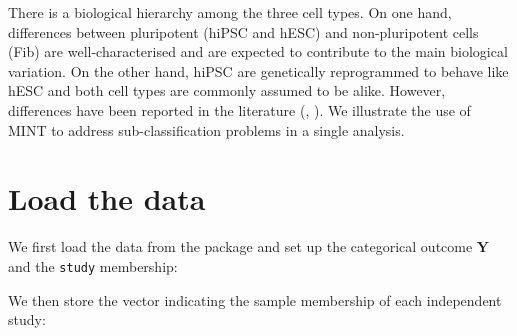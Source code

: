 \documentclass[
]{book}
\newenvironment{Shaded}{\begin{snugshade}}{\end{snugshade}}
\newcommand{\CommentTok}[1]{\textcolor[rgb]{0.56,0.35,0.01}{\textit{#1}}}
\newcommand{\FunctionTok}[1]{\textcolor[rgb]{0.00,0.00,0.00}{#1}}
\newcommand{\NormalTok}[1]{#1}
\newcommand{\OtherTok}[1]{\textcolor[rgb]{0.56,0.35,0.01}{#1}}
\newcommand{\SpecialCharTok}[1]{\textcolor[rgb]{0.00,0.00,0.00}{#1}}
\begin{document}
There is a biological hierarchy among the three cell types. On one hand, differences between pluripotent (hiPSC and hESC) and non-pluripotent cells (Fib) are well-characterised and are expected to contribute to the main biological variation. On the other hand, hiPSC are genetically reprogrammed to behave like hESC and both cell types are commonly assumed to be alike. However, differences have been reported in the literature (\citet{Chi09}, \citet{New10}). We illustrate the use of MINT to address sub-classification problems in a single analysis.

\hypertarget{mint:load}{%
\section{Load the data}\label{mint:load}}

We first load the data from the package and set up the categorical outcome \(\boldsymbol Y\) and the \texttt{study} membership:

\begin{Shaded}
\end{Shaded}

We then store the vector indicating the sample membership of each independent study:

\begin{Shaded}
\end{Shaded}
\end{document}
